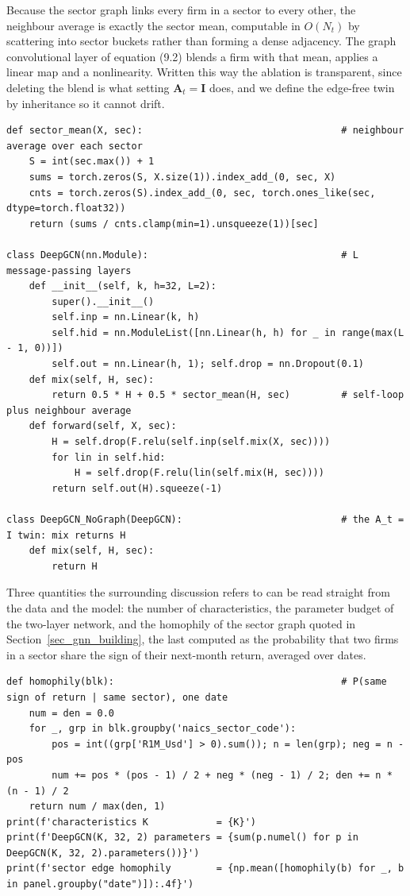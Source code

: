 Because the sector graph links every firm in a sector to every other, the neighbour average is exactly the sector mean, computable in $O(N_t)$ by scattering into sector buckets rather than forming a dense adjacency. The graph convolutional layer of equation (9.2) blends a firm with that mean, applies a linear map and a nonlinearity. Written this way the ablation is transparent, since deleting the blend is what setting $\mathbf{A}_t = \mathbf{I}$ does, and we define the edge-free twin by inheritance so it cannot drift.

\begin{verbatim}
def sector_mean(X, sec):                                   # neighbour average over each sector
    S = int(sec.max()) + 1
    sums = torch.zeros(S, X.size(1)).index_add_(0, sec, X)
    cnts = torch.zeros(S).index_add_(0, sec, torch.ones_like(sec, dtype=torch.float32))
    return (sums / cnts.clamp(min=1).unsqueeze(1))[sec]

class DeepGCN(nn.Module):                                  # L message-passing layers
    def __init__(self, k, h=32, L=2):
        super().__init__()
        self.inp = nn.Linear(k, h)
        self.hid = nn.ModuleList([nn.Linear(h, h) for _ in range(max(L - 1, 0))])
        self.out = nn.Linear(h, 1); self.drop = nn.Dropout(0.1)
    def mix(self, H, sec):
        return 0.5 * H + 0.5 * sector_mean(H, sec)         # self-loop plus neighbour average
    def forward(self, X, sec):
        H = self.drop(F.relu(self.inp(self.mix(X, sec))))
        for lin in self.hid:
            H = self.drop(F.relu(lin(self.mix(H, sec))))
        return self.out(H).squeeze(-1)

class DeepGCN_NoGraph(DeepGCN):                            # the A_t = I twin: mix returns H
    def mix(self, H, sec):
        return H
\end{verbatim}

Three quantities the surrounding discussion refers to can be read straight from the data and the model: the number of characteristics, the parameter budget of the two-layer network, and the homophily of the sector graph quoted in Section~\ref{sec_gnn_building}, the last computed as the probability that two firms in a sector share the sign of their next-month return, averaged over dates.

\begin{verbatim}
def homophily(blk):                                        # P(same sign of return | same sector), one date
    num = den = 0.0
    for _, grp in blk.groupby('naics_sector_code'):
        pos = int((grp['R1M_Usd'] > 0).sum()); n = len(grp); neg = n - pos
        num += pos * (pos - 1) / 2 + neg * (neg - 1) / 2; den += n * (n - 1) / 2
    return num / max(den, 1)
print(f'characteristics K            = {K}')
print(f'DeepGCN(K, 32, 2) parameters = {sum(p.numel() for p in DeepGCN(K, 32, 2).parameters())}')
print(f'sector edge homophily        = {np.mean([homophily(b) for _, b in panel.groupby("date")]):.4f}')
\end{verbatim}

